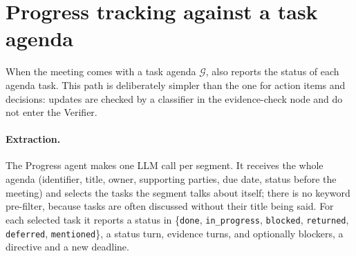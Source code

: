 \section{Progress tracking against a task agenda}
\label{app:progress}

When the meeting comes with a task agenda $\mathcal{G}$, \method{} also reports the status of each agenda task.
This path is deliberately simpler than the one for action items and decisions: updates are checked by a classifier in the evidence-check node and do not enter the Verifier.

\paragraph{Extraction.}
The Progress agent makes one LLM call per segment.
It receives the whole agenda (identifier, title, owner, supporting parties, due date, status before the meeting) and selects the tasks the segment talks about itself; there is no keyword pre-filter, because tasks are often discussed without their title being said.
For each selected task it reports a status in \{\texttt{done}, \texttt{in\_progress}, \texttt{blocked}, \texttt{returned}, \texttt{deferred}, \texttt{mentioned}\}, a status turn, evidence turns, and optionally blockers, a directive and a new deadline.

